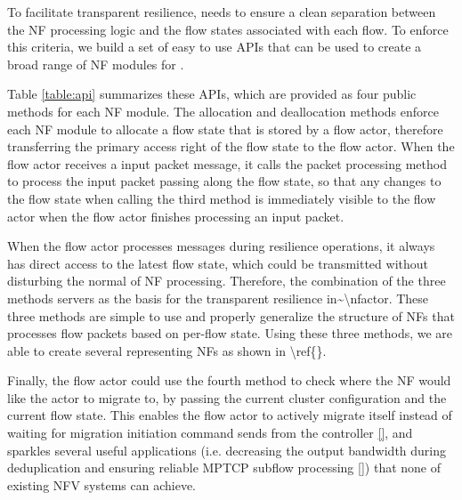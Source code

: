 To facilitate transparent resilience, \nfactor needs to ensure a clean separation between the NF processing logic and the flow states associated with each flow. To enforce this criteria, we build a set of easy to use APIs that can be used to create a broad range of NF modules for \nfactor.

Table \ref{table:api} \ac{summarizes these APIs, which are provided as four public methods for each NF module. The allocation and deallocation methods enforce each NF module to allocate a flow state that is stored by a flow actor, therefore transferring the primary access right of the flow state to the flow actor. When the flow actor receives a input packet message, it calls the packet processing method to process the input packet passing along the flow state, so that any changes to the flow state when calling the third method is immediately visible to the flow actor when the flow actor finishes processing an input packet.}

\ac{When the flow actor processes messages during resilience operations, it always has direct access to the latest flow state, which could be transmitted without disturbing the normal of NF processing. Therefore, the combination of the three methods servers as the basis for the transparent resilience in~\nfactor. These three methods are simple to use and properly generalize the structure of NFs that processes flow packets based on per-flow state. Using these three methods, we are able to create several representing NFs as shown in \ref{}.} 

Finally, the flow actor could use the fourth method to check where the NF would like the actor to migrate to, by passing the current cluster configuration and the current flow state. This enables the flow actor to actively migrate itself instead of waiting for migration initiation command sends from the controller \ref{}, and sparkles several useful applications (i.e. decreasing the output bandwidth during deduplication and ensuring reliable MPTCP subflow processing \ref{}) that none of existing NFV systems can achieve.
